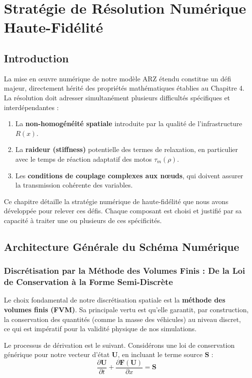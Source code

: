 \chapter{Stratégie de Résolution Numérique Haute-Fidélité}
\label{chap:strategie_resolution_numerique}

\section{Introduction}
La mise en œuvre numérique de notre modèle ARZ étendu constitue un défi majeur, directement hérité des propriétés mathématiques établies au Chapitre 4. La résolution doit adresser simultanément plusieurs difficultés spécifiques et interdépendantes :
\begin{enumerate}
    \item La \textbf{non-homogénéité spatiale} introduite par la qualité de l'infrastructure $R(x)$.
    \item La \textbf{raideur (stiffness)} potentielle des termes de relaxation, en particulier avec le temps de réaction adaptatif des motos $\tau_m(\rho)$.
    \item Les \textbf{conditions de couplage complexes aux nœuds}, qui doivent assurer la transmission cohérente des variables.
\end{enumerate}

Ce chapitre détaille la stratégie numérique de haute-fidélité que nous avons développée pour relever ces défis. Chaque composant est choisi et justifié par sa capacité à traiter une ou plusieurs de ces spécificités.

\section{Architecture Générale du Schéma Numérique}

\subsection{Discrétisation par la Méthode des Volumes Finis : De la Loi de Conservation à la Forme Semi-Discrète}
Le choix fondamental de notre discrétisation spatiale est la \textbf{méthode des volumes finis (FVM)}. Sa principale vertu est qu'elle garantit, par construction, la conservation des quantités (comme la masse des véhicules) au niveau discret, ce qui est impératif pour la validité physique de nos simulations.

Le processus de dérivation est le suivant. Considérons une loi de conservation générique pour notre vecteur d'état $\mathbf{U}$, en incluant le terme source $\mathbf{S}$ :
\[ \frac{\partial \mathbf{U}}{\partial t} + \frac{\partial \mathbf{F}(\mathbf{U})}{\partial x} = \mathbf{S} \]

